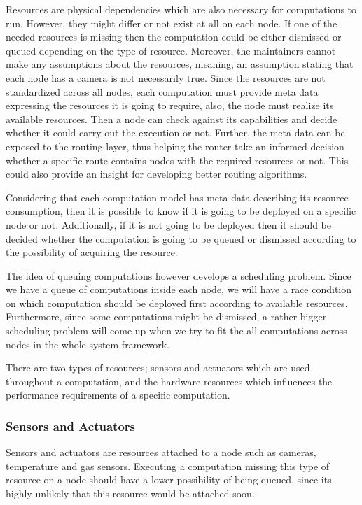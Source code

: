 Resources are physical dependencies which are also necessary for computations to run. However, they might differ or not exist at all on each node. If one of the needed resources is missing then the computation could be either dismissed or queued depending on the type of resource. Moreover, the maintainers cannot make any assumptions about the resources, meaning, an assumption stating that each node has a camera is not necessarily true. Since the resources are not standardized across all nodes, each computation must provide meta data expressing the resources it is going to require, also, the node must realize its available resources. Then a node can check against its capabilities and decide whether it could carry out the execution or not. Further, the meta data can be exposed to the routing layer, thus helping the router take an informed decision whether a specific route contains nodes with the required resources or not. This could also provide an insight for developing better routing algorithms.

Considering that each computation model has meta data describing its resource consumption, then it is possible to know if it is going to be deployed on a specific node or not. Additionally, if it is not going to be deployed then it should be decided whether the computation is going to be queued or dismissed according to the possibility of acquiring the resource.

The idea of queuing computations however develops a scheduling problem. Since we have a queue of computations inside each node, we will have a race condition on which computation should be deployed first according to available resources. Furthermore, since some computations might be dismissed, a rather bigger scheduling problem will come up when we try to fit the all computations across nodes in the whole system framework.

 There are two types of resources; sensors and actuators which are used throughout a computation, and the hardware resources which influences the performance requirements of a specific computation.


\subsubsection{Sensors and Actuators}

  Sensors and actuators are resources attached to a node such as cameras, temperature and gas sensors. Executing a computation missing this type of resource on a node should have a lower possibility of being queued, since its highly unlikely that this resource would be attached soon. 
  
